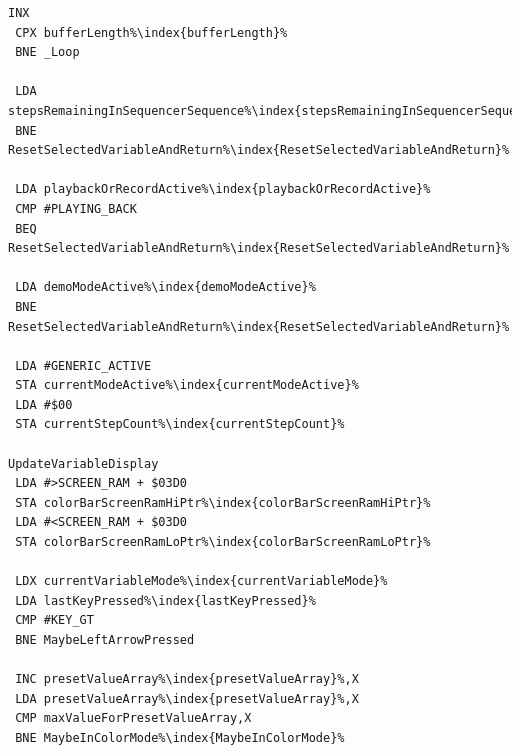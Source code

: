 \begin{minipage}[b]{0.33\linewidth}
\begin{lrbox}{\mybox}
\begin{lstlisting}[basicstyle=\ttfamily\tiny,escapechar=\%]
 INX
 CPX bufferLength%\index{bufferLength}%
 BNE _Loop

 LDA stepsRemainingInSequencerSequence%\index{stepsRemainingInSequencerSequence}%
 BNE ResetSelectedVariableAndReturn%\index{ResetSelectedVariableAndReturn}%

 LDA playbackOrRecordActive%\index{playbackOrRecordActive}%
 CMP #PLAYING_BACK
 BEQ ResetSelectedVariableAndReturn%\index{ResetSelectedVariableAndReturn}%

 LDA demoModeActive%\index{demoModeActive}%
 BNE ResetSelectedVariableAndReturn%\index{ResetSelectedVariableAndReturn}%

 LDA #GENERIC_ACTIVE
 STA currentModeActive%\index{currentModeActive}%
 LDA #$00
 STA currentStepCount%\index{currentStepCount}%

UpdateVariableDisplay
 LDA #>SCREEN_RAM + $03D0
 STA colorBarScreenRamHiPtr%\index{colorBarScreenRamHiPtr}%
 LDA #<SCREEN_RAM + $03D0
 STA colorBarScreenRamLoPtr%\index{colorBarScreenRamLoPtr}%

 LDX currentVariableMode%\index{currentVariableMode}%
 LDA lastKeyPressed%\index{lastKeyPressed}%
 CMP #KEY_GT
 BNE MaybeLeftArrowPressed

 INC presetValueArray%\index{presetValueArray}%,X
 LDA presetValueArray%\index{presetValueArray}%,X
 CMP maxValueForPresetValueArray,X
 BNE MaybeInColorMode%\index{MaybeInColorMode}%
\end{lstlisting}
\end{lrbox}%
\scalebox{0.8}{\usebox{\mybox}}
\end{minipage}
\hspace{-0.1cm}
